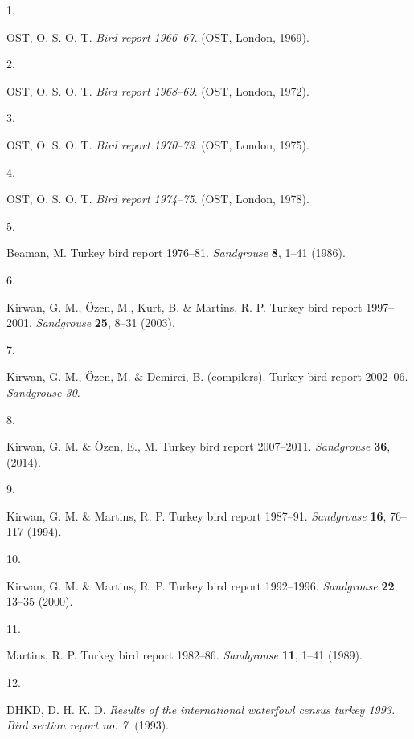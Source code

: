 \documentclass[
  letterpaper,
  DIV=11,
  numbers=noendperiod]{scrreprt}
\newlength{\cslhangindent}
\newlength{\csllabelwidth}
\newenvironment{CSLReferences}[2] %
 {\begin{list}{}{%
  \setlength{\itemindent}{0pt}
  \setlength{\leftmargin}{0pt}
  \setlength{\parsep}{0pt}
  \ifodd #1
   \setlength{\leftmargin}{\cslhangindent}
   \setlength{\itemindent}{-1\cslhangindent}
  \fi
  \setlength{\itemsep}{#2\baselineskip}}}
 {\end{list}}
\newcommand{\CSLLeftMargin}[1]{\parbox[t]{\csllabelwidth}{\strut#1\strut}}
\newcommand{\CSLRightInline}[1]{\parbox[t]{\linewidth - \csllabelwidth}{\strut#1\strut}}
\begin{document}
\label{refs}
\begin{CSLReferences}{0}{0}
\CSLLeftMargin{1. }%
\CSLRightInline{OST, O. S. O. T. \emph{Bird report 1966--67}. (OST,
London, 1969).}

\CSLLeftMargin{2. }%
\CSLRightInline{OST, O. S. O. T. \emph{Bird report 1968--69}. (OST,
London, 1972).}

\CSLLeftMargin{3. }%
\CSLRightInline{OST, O. S. O. T. \emph{Bird report 1970--73}. (OST,
London, 1975).}

\CSLLeftMargin{4. }%
\CSLRightInline{OST, O. S. O. T. \emph{Bird report 1974--75}. (OST,
London, 1978).}

\CSLLeftMargin{5. }%
\CSLRightInline{Beaman, M. Turkey bird report 1976--81.
\emph{Sandgrouse} \textbf{8}, 1--41 (1986).}

\CSLLeftMargin{6. }%
\CSLRightInline{Kirwan, G. M., Özen, M., Kurt, B. \& Martins, R. P.
Turkey bird report 1997--2001. \emph{Sandgrouse} \textbf{25}, 8--31
(2003).}

\CSLLeftMargin{7. }%
\CSLRightInline{Kirwan, G. M., Özen, M. \& Demirci, B. (compilers).
Turkey bird report 2002--06. \emph{Sandgrouse 30}.}

\CSLLeftMargin{8. }%
\CSLRightInline{Kirwan, G. M. \& Özen, E., M. Turkey bird report
2007--2011. \emph{Sandgrouse} \textbf{36}, (2014).}

\CSLLeftMargin{9. }%
\CSLRightInline{Kirwan, G. M. \& Martins, R. P. Turkey bird report
1987--91. \emph{Sandgrouse} \textbf{16}, 76--117 (1994).}

\CSLLeftMargin{10. }%
\CSLRightInline{Kirwan, G. M. \& Martins, R. P. Turkey bird report
1992--1996. \emph{Sandgrouse} \textbf{22}, 13--35 (2000).}

\CSLLeftMargin{11. }%
\CSLRightInline{Martins, R. P. Turkey bird report 1982--86.
\emph{Sandgrouse} \textbf{11}, 1--41 (1989).}

\CSLLeftMargin{12. }%
\CSLRightInline{DHKD, D. H. K. D. \emph{Results of the international
waterfowl census turkey 1993. Bird section report no. 7}. (1993).}


\end{CSLReferences}
\end{document}
